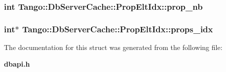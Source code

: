 \subsubsection[{prop\-\_\-nb}]{\setlength{\rightskip}{0pt plus 5cm}int Tango\-::\-Db\-Server\-Cache\-::\-Prop\-Elt\-Idx\-::prop\-\_\-nb}\label{structTango_1_1DbServerCache_1_1PropEltIdx_aaf25dedcf01ca154ed028ef9af2326ad}
\subsubsection[{props\-\_\-idx}]{\setlength{\rightskip}{0pt plus 5cm}int$\ast$ Tango\-::\-Db\-Server\-Cache\-::\-Prop\-Elt\-Idx\-::props\-\_\-idx}\label{structTango_1_1DbServerCache_1_1PropEltIdx_ad03a0a0dae699a0d96d8c4bd18ac78b5}


The documentation for this struct was generated from the following file\-:\begin{DoxyCompactItemize}
\item 
{\bf dbapi.\-h}\end{DoxyCompactItemize}
